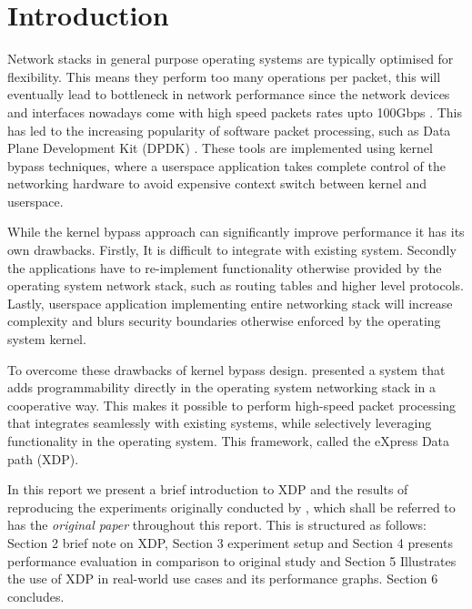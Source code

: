 \documentclass[12pt,titlepage]{article}
\begin{document}


\doublespacing
\tableofcontents
\singlespacing

\newpage

\doublespacing


\section{Introduction}

Network stacks in general purpose operating systems are typically optimised for flexibility. 
This means they perform too many operations per packet, this will eventually lead to bottleneck in network performance  since the network devices and interfaces nowadays come with high speed packets rates upto 100Gbps . This has led to the increasing popularity of software packet processing, such as Data Plane Development Kit (DPDK) \cite{dpdk}. These tools are implemented using kernel bypass techniques, where a userspace application takes complete control of the networking hardware to avoid expensive context switch between kernel and userspace. 

While the kernel bypass approach can significantly improve performance it has its own drawbacks. Firstly, It is difficult to integrate with existing system. Secondly the applications have to re-implement functionality otherwise provided by the operating system network stack, 
such as routing tables and higher level protocols. Lastly, userspace application implementing entire networking stack will increase complexity and blurs security boundaries otherwise enforced by the operating system kernel. 

To overcome these drawbacks of kernel bypass design. \citet{xdp} presented a system that adds programmability directly in the operating system networking stack in a cooperative way. This makes it possible to perform high-speed packet processing that integrates seamlessly with existing systems, while selectively leveraging functionality in the operating system. This framework, called the eXpress Data path (XDP). 

In this report we present a brief introduction to XDP and the results of reproducing the experiments originally conducted by \citet*{xdp}, which shall be referred to has the \textit{original paper} throughout this report.
This is structured as follows: Section 2 brief note on XDP, Section 3 experiment setup and Section 4 presents performance evaluation in comparison to original study and Section 5 Illustrates the use of XDP in real-world use cases and its performance graphs. Section 6 concludes.
\end{document}
